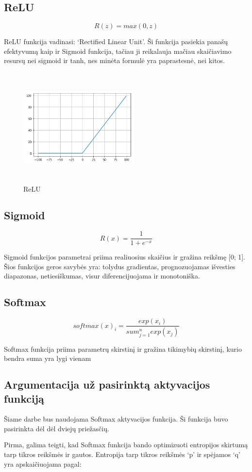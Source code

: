 \documentclass{VUMIFInfKursinis}
\begin{document}
\subsection{ReLU}
\[
  R(z) = max(0, z)
\]

\par
ReLU funkcija vadinasi: ‘Rectified Linear Unit’. Ši funkcija pasiekia panašų efektyvumą
kaip ir Sigmoid funkcija, tačiau ji reikalauja mačiau skaičiavimo resursų nei sigmoid
ir tanh, nes minėta formulė yra paprastesnė, nei kitos.

\begin{figure}[ht]
  \includegraphics[width=6cm,height=6cm,keepaspectratio]{relu.png}
  \caption{ReLU}
  \label{fig:relu}
\end{figure}

\subsection{Sigmoid}
\[
  R(x) = \frac{1}{1 + e^{-x}}
\]

\par
Sigmoid funkcijos parametrai priima realiuosius skaičius ir gražina reikšmę [0; 1].
Šios funkcijos geros savybės yra: tolydus gradientas, prognozuojamas išvesties
diapazonas, netiesiškumas, visur diferencijuojama ir monotoniška.

\subsection{Softmax}
\[
  softmax(x)_i = \frac{exp(x_i)}{sum_{j=1}^{n}exp(x_j)}
\]

\par
Softmax funkcija priima parametrų skirstinį ir gražina tikimybių skirstinį,
kurio bendra suma yra lygi vienam

\subsection{Argumentacija už pasirinktą aktyvacijos funkciją}
\par
Šiame darbe bus naudojama Softmax aktyvacijos funkcija. Ši funkcija buvo
pasirinkta dėl dėl dviejų priežasčių.
\par
Pirma, galima teigti, kad Softmax funkcija bando optimizuoti entropijos
skirtumą tarp tikros reikšmės ir gautos. Entropija tarp tikros reikšmės
‘p’ ir spėjamos ‘q’ yra apskaičiuojama pagal:
\end{document}
